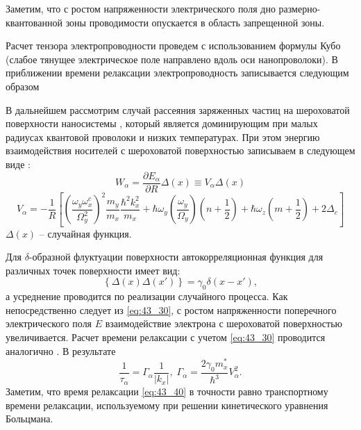 Заметим, что с ростом напряженности электрического поля дно размерно-квантованной зоны проводимости опускается в область запрещенной зоны.

Расчет тензора электропроводности проведем с использованием формулы Кубо
\cite{Kubo1957a} (слабое тянущее электрическое поле направлено вдоль оси нанопроволоки). В приближении времени релаксации \cite{Khamidullin2002} электропроводность записывается следующим образом 

В дальнейшем рассмотрим случай рассеяния заряженных частиц на шероховатой поверхности наносистемы \cite{Sakaki1987},  который является доминирующим при малых радиусах квантовой проволоки и низких температурах. При этом энергию взаимодействия носителей с шероховатой поверхностью записываем в следующем виде \cite{Sakaki1987,Motohisa1992}:
\begin{equation} \label{eq:43_30} 
W_{\alpha }=\frac{\partial E_{\alpha }}{\partial R}\Delta \left(x\right)\equiv V_{\alpha }\Delta \left(x\right) 
\end{equation}
\[
V_{\alpha }=-\frac{1}{R}\left[{\left(\frac{{\omega }_y{\omega }^c_x}{{\Omega }^2_y}\right)}^2\frac{m_y}{m_x}\frac{{\hbar }^2k^2_x}{m_x}+\hbar {\omega }_y\left(\frac{{\omega }_y}{{\Omega }_y}\right)\left(n+\frac{1}{2}\right)+\hbar {\omega }_z\left(m+\frac{1}{2}\right)+2{\Delta }_c\right]
\] 
$\Delta \left(x\right)$ -- случайная функция.

Для $\delta $-образной флуктуации поверхности автокорреляционная функция для различных точек поверхности имеет вид:
\[
\left\{\Delta \left(x\right)\Delta \left(x'\right)\right\}={\gamma }_0\delta \left(x-x'\right),
\] 
а усреднение проводится по реализации случайного процесса.  Как непосредственно следует из \eqref{eq:43_30}, с ростом напряженности поперечного электрического поля $E$ взаимодействие электрона с шероховатой поверхностью увеличивается. Расчет времени релаксации с учетом \eqref{eq:43_30} проводится аналогично \cite{Karapetyan2011}. В результате
\begin{equation} \label{eq:43_40} 
\frac{1}{{\tau }_{\alpha }}={\Gamma }_{\alpha }\frac{1}{\left|k_x\right|},\;
\Gamma_{\alpha }=\frac{2\gamma_0 m^*_x}{\hbar^3} V^2_{\alpha}.  
\end{equation}
Заметим, что время релаксации \eqref{eq:43_40} в точности равно транспортному времени релаксации, используемому при решении кинетического уравнения Больцмана.

